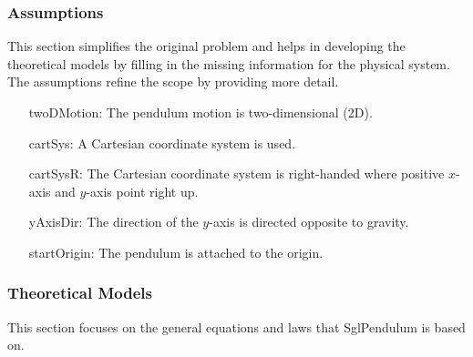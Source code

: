 \documentclass[12pt]{article}
\begin{document}
\subsubsection{Assumptions}
\label{Sec:Assumps}
This section simplifies the original problem and helps in developing the theoretical models by filling in the missing information for the physical system. The assumptions refine the scope by providing more detail.

\begin{itemize}
\item[twoDMotion:\phantomsection\label{twoDMotion}]{The pendulum motion is two-dimensional (2D).}
\item[cartSys:\phantomsection\label{cartSys}]{A Cartesian coordinate system is used.}
\item[cartSysR:\phantomsection\label{cartSysR}]{The Cartesian coordinate system is right-handed where positive $x$-axis and $y$-axis point right up.}
\item[yAxisDir:\phantomsection\label{yAxisDir}]{The direction of the $y$-axis is directed opposite to gravity.}
\item[startOrigin:\phantomsection\label{startOrigin}]{The pendulum is attached to the origin.}
\end{itemize}
\subsubsection{Theoretical Models}
\label{Sec:TMs}
This section focuses on the general equations and laws that SglPendulum is based on.
\end{document}
